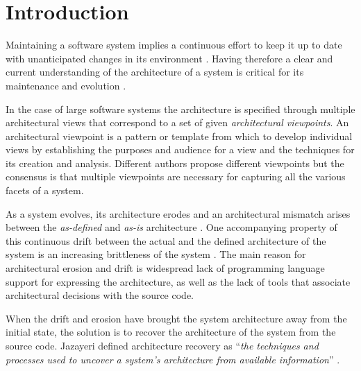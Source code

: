 \documentclass[preprint,12pt]{elsarticle}
\begin{document}
\section{Introduction} \label{sec:Introduction}

Maintaining a software system implies a continuous effort to keep it up to date with unanticipated changes in its environment \cite{lehman-softev}. Having therefore a clear and current understanding of the architecture of a system is critical for its maintenance and evolution \cite{Duca09c, pollet-sar}.

In the case of large software systems the architecture is specified through multiple architectural views that correspond to a set of given {\em architectural viewpoints}. An architectural viewpoint is a pattern or template from which to develop individual views by establishing the purposes and audience for a view and the techniques for its creation and analysis. Different authors propose different viewpoints \cite{bass-architecture, kruchten-4plus, hof-apparch} but the consensus is that multiple viewpoints are necessary for capturing all the various facets of a system.

As a system evolves, its architecture erodes \cite{perry-foundations} and an architectural mismatch arises between the {\em as-defined} and {\em as-is} architecture \cite{garlan-mismatch}. One accompanying property of this continuous drift between the actual and the defined architecture of the system is an increasing brittleness of the system \cite{perry-foundations}. The main reason for architectural erosion and drift is widespread lack of programming language support for expressing the architecture, as well as the lack of tools that associate architectural decisions with the source code. %

When the drift and erosion have brought the system architecture away from the initial state, the solution is to recover the architecture of the system from the source code. Jazayeri defined architecture recovery as ``{\em the techniques and processes used to uncover a system's architecture from available information}'' \cite{jaza-archevo}. 
\end{document}
